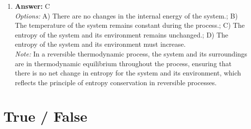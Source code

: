 \documentclass[12pt]{article}
\begin{document}
\begin{enumerate}[label=\arabic*.]
\item \textbf{Answer:} C
\\ \textit{Options:} A) There are no changes in the internal energy of the system.; B) The temperature of the system remains constant during the process.; C) The entropy of the system and its environment remains unchanged.; D) The entropy of the system and its environment must increase.
\\ \textit{Note:} In a reversible thermodynamic process, the system and its surroundings are in thermodynamic equilibrium throughout the process, ensuring that there is no net change in entropy for the system and its environment, which reflects the principle of entropy conservation in reversible processes.
\end{enumerate}

\section*{True / False}
\end{document}

